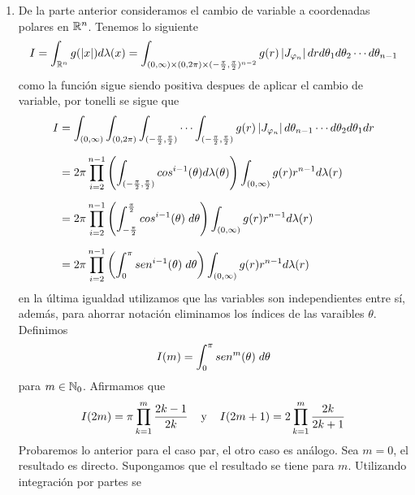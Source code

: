 \documentclass{article}
\begin{document}
\begin{enumerate}
    \item De la parte anterior consideramos el cambio de variable a coordenadas polares en 
    $\mathbb{R}^{n}$. Tenemos lo siguiente
    \begin{equation*}
        I=\int_{\mathbb{R}^{n}}g(\left|x \right|)d\lambda(x)=\int_{(0,\infty)\times(0,2\pi)\times
        (-\frac{\pi}{2},\frac{\pi}{2})^{n-2}}g(r)\left|J_{\varphi_{n}} \right|drd\theta_{1}d\theta_{2}
        \cdots d\theta_{n-1}
    \end{equation*}
    como la función sigue siendo positiva despues de aplicar el cambio de variable, por tonelli 
    se sigue que
    \begin{align*}
        I &= \int_{(0,\infty)}\int_{(0,2\pi)}\int_{(-\frac{\pi}{2},\frac{\pi}{2})}\cdots
        \int_{(-\frac{\pi}{2},\frac{\pi}{2})}g(r)\left|J_{\varphi_{n}} \right|d\theta_{n-1}\cdots 
        d\theta_{2}d\theta_{1}dr \\[2mm]
        &= 2\pi\prod_{i=2}^{n-1}\left(\int_{(-\frac{\pi}{2},\frac{\pi}{2})}cos^{i-1}(\theta)
        d\lambda(\theta)\right)\int_{(0,\infty)}g(r)r^{n-1}d\lambda(r) \\[2mm]
        &= 2\pi\prod_{i=2}^{n-1}\left(\int_{-\frac{\pi}{2}}^{\frac{\pi}{2}}cos^{i-1}(\theta)
        \hspace{1mm}d\theta\right)\int_{(0,\infty)}g(r)r^{n-1}d\lambda(r) \\[2mm]
        &= 2\pi\prod_{i=2}^{n-1}\left(\int_{0}^{\pi}sen^{i-1}(\theta)
        \hspace{1mm}d\theta\right)\int_{(0,\infty)}g(r)r^{n-1}d\lambda(r)
    \end{align*}
    en la última igualdad utilizamos que las variables son independientes entre sí, además, para
    ahorrar notación eliminamos los índices de las varaibles $\theta$. Definimos
    \begin{equation*}
        I(m)=\int_{0}^{\pi}sen^{m}(\theta)\hspace{1mm}d\theta
    \end{equation*}
    para $m\in\mathbb{N}_{0}$. Afirmamos que
    \begin{equation*}
        I(2m)=\pi\prod_{k=1}^{m}\frac{2k-1}{2k}\hspace{4mm}\text{y}\hspace{4mm}
        I(2m+1)=2\prod_{k=1}^{m}\frac{2k}{2k+1}
    \end{equation*}
    Probaremos lo anterior para el caso par, el otro caso es análogo. Sea $m=0$, el resultado es
    directo. Supongamos que el resultado se tiene para $m$. Utilizando integración por partes se 

\end{enumerate}
\end{document}
